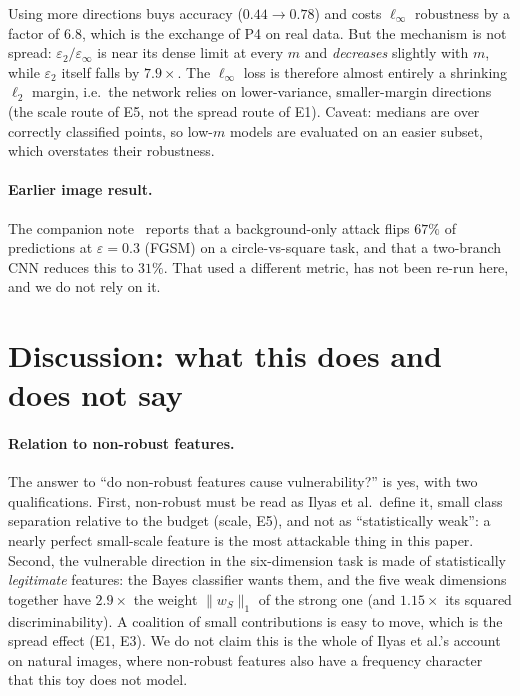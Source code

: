 \documentclass[11pt]{article}
\newcommand{\linf}{\ell_\infty}
\newcommand{\ltwo}{\ell_2}
\newcommand{\epsinf}{\varepsilon_\infty}
\newcommand{\epstwo}{\varepsilon_2}
\begin{document}
Using more directions buys accuracy ($0.44\to0.78$) and costs $\linf$ robustness by
a factor of $6.8$, which is the exchange of P4 on real data. But the mechanism is not
spread: $\epstwo/\epsinf$ is near its dense limit at every $m$ and
\emph{decreases} slightly with $m$, while $\epstwo$ itself falls by
$7.9\times$. The $\linf$ loss is therefore almost entirely a shrinking $\ltwo$
margin, i.e.\ the network relies on lower-variance, smaller-margin directions
(the scale route of E5, not the spread route of E1). Caveat: medians are over
correctly classified points, so low-$m$ models are evaluated on an easier subset,
which overstates their robustness.

\paragraph{Earlier image result.} The companion note~\cite{earlier} reports that a
background-only attack flips $67\%$ of predictions at $\varepsilon=0.3$ (FGSM) on a
circle-vs-square task, and that a two-branch CNN reduces this to $31\%$. That used a
different metric, has not been re-run here, and we do not rely on it.

\section{Discussion: what this does and does not say}

\paragraph{Relation to non-robust features.} The answer to ``do non-robust
features cause vulnerability?'' is yes, with two qualifications. First,
non-robust must be read as Ilyas et al.\ define it, small class separation
relative to the budget (scale, E5), and not as ``statistically weak'': a
nearly perfect small-scale feature is the most attackable thing in this paper.
Second, the vulnerable direction in the six-dimension task is made of
statistically \emph{legitimate} features: the Bayes classifier wants them, and
the five weak dimensions together have $2.9\times$ the weight $\|w_S\|_1$ of the
strong one (and $1.15\times$ its squared discriminability). A coalition of small contributions is easy to move, which is the spread
effect (E1, E3). We do not claim this is the whole of Ilyas et al.'s account on
natural images, where non-robust features also have a frequency character
that this toy does not model.
\end{document}
